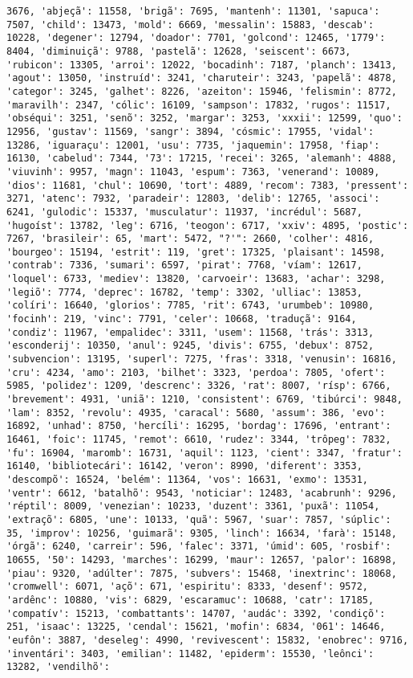 \documentclass[11pt]{article}
\begin{document}
\begin{Verbatim}[commandchars=\\\{\}]
3676, 'abjeçã': 11558, 'brigã': 7695, 'mantenh': 11301, 'sapuca': 7507, 'child': 13473, 'mold': 6669, 'messalin': 15883, 'descab': 10228, 'degener': 12794, 'doador': 7701, 'golcond': 12465, '1779': 8404, 'diminuiçã': 9788, 'pastelã': 12628, 'seiscent': 6673, 'rubicon': 13305, 'arroi': 12022, 'bocadinh': 7187, 'planch': 13413, 'agout': 13050, 'instruíd': 3241, 'charuteir': 3243, 'papelã': 4878, 'categor': 3245, 'galhet': 8226, 'azeiton': 15946, 'felismin': 8772, 'maravilh': 2347, 'cólic': 16109, 'sampson': 17832, 'rugos': 11517, 'obséqui': 3251, 'senõ': 3252, 'margar': 3253, 'xxxii': 12599, 'quo': 12956, 'gustav': 11569, 'sangr': 3894, 'cósmic': 17955, 'vidal': 13286, 'iguaraçu': 12001, 'usu': 7735, 'jaquemin': 17958, 'fiap': 16130, 'cabelud': 7344, '73': 17215, 'recei': 3265, 'alemanh': 4888, 'viuvinh': 9957, 'magn': 11043, 'espum': 7363, 'venerand': 10089, 'dios': 11681, 'chul': 10690, 'tort': 4889, 'recom': 7383, 'pressent': 3271, 'atenc': 7932, 'paradeir': 12803, 'delib': 12765, 'associ': 6241, 'gulodic': 15337, 'musculatur': 11937, 'incrédul': 5687, 'hugoíst': 13782, 'leg': 6716, 'teogon': 6717, 'xxiv': 4895, 'postic': 7267, 'brasileir': 65, 'mart': 5472, "?'": 2660, 'colher': 4816, 'bourgeo': 15194, 'estrit': 119, 'gret': 17325, 'plaisant': 14598, 'contrab': 7336, 'sumari': 6597, 'pirat': 7768, 'víam': 12617, 'loquel': 6733, 'mediev': 13820, 'carvoeir': 13683, 'achar': 3298, 'legiõ': 7774, 'deprec': 16782, 'temp': 3302, 'ulliac': 13853, 'colíri': 16640, 'glorios': 7785, 'rit': 6743, 'urumbeb': 10980, 'focinh': 219, 'vinc': 7791, 'celer': 10668, 'traduçã': 9164, 'condiz': 11967, 'empalidec': 3311, 'usem': 11568, 'trás': 3313, 'esconderij': 10350, 'anul': 9245, 'divis': 6755, 'debux': 8752, 'subvencion': 13195, 'superl': 7275, 'fras': 3318, 'venusin': 16816, 'cru': 4234, 'amo': 2103, 'bilhet': 3323, 'perdoa': 7805, 'ofert': 5985, 'polidez': 1209, 'descrenc': 3326, 'rat': 8007, 'rísp': 6766, 'brevement': 4931, 'uniã': 1210, 'consistent': 6769, 'tibúrci': 9848, 'lam': 8352, 'revolu': 4935, 'caracal': 5680, 'assum': 386, 'evo': 16892, 'unhad': 8750, 'hercíli': 16295, 'bordag': 17696, 'entrant': 16461, 'foic': 11745, 'remot': 6610, 'rudez': 3344, 'trôpeg': 7832, 'fu': 16904, 'maromb': 16731, 'aquil': 1123, 'cient': 3347, 'fratur': 16140, 'bibliotecári': 16142, 'veron': 8990, 'diferent': 3353, 'descompõ': 16524, 'belém': 11364, 'vos': 16631, 'exmo': 13531, 'ventr': 6612, 'batalhõ': 9543, 'noticiar': 12483, 'acabrunh': 9296, 'réptil': 8009, 'venezian': 10233, 'duzent': 3361, 'puxã': 11054, 'extraçõ': 6805, 'une': 10133, 'quã': 5967, 'suar': 7857, 'súplic': 35, 'improv': 10256, 'guimarã': 9305, 'linch': 16634, 'farà': 15148, 'órgã': 6240, 'carreir': 596, 'falec': 3371, 'úmid': 605, 'rosbif': 10655, '50': 14293, 'marches': 16299, 'maur': 12657, 'palor': 16898, 'piau': 9320, 'adúlter': 7875, 'subvers': 15468, 'inextrinc': 18068, 'cromwell': 6071, 'açõ': 671, 'espiritu': 8333, 'desenf': 9572, 'ardênc': 10880, 'vis': 6829, 'escaramuc': 10688, 'catr': 17185, 'compatív': 15213, 'combattants': 14707, 'audác': 3392, 'condiçõ': 251, 'isaac': 13225, 'cendal': 15621, 'mofin': 6834, '061': 14646, 'eufôn': 3887, 'deseleg': 4990, 'revivescent': 15832, 'enobrec': 9716, 'inventári': 3403, 'emilian': 11482, 'epiderm': 15530, 'leônci': 13282, 'vendilhõ': 
\end{Verbatim}
\end{document}
